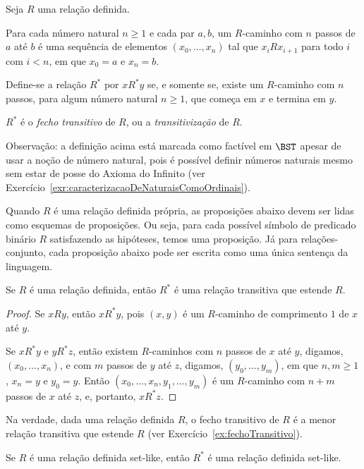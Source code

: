\begin{definition}[$\BST$]
    Seja $R$ uma relação definida.

    Para cada número natural $n\geq 1$ e cada par $a, b$, um $R$-caminho com $n$ passos de $a$ até $b$ é uma sequência de elementos $(x_0, \dots, x_{n})$ tal que $x_i R x_{i+1}$ para todo $i$ com $i<n$, em que $x_0=a$ e $x_{n}=b$.

    Define-se a relação $R^*$ por $x R^* y$ se, e somente se, existe um $R$-caminho com $n$ passos, para algum número natural $n\geq 1$, que começa em $x$ e termina em $y$.

    $R^*$ é o \emph{fecho transitivo} de $R$, ou a \emph{transitivização} de $R$.
\end{definition}

Observação: a definição acima está marcada como factível em $\BST$ apesar de usar a noção de número natural, pois é possível definir números naturais mesmo sem estar de posse do Axioma do Infinito (ver Exercício~\ref{exr:caracterizacaoDeNaturaisComoOrdinais}).

Quando $R$ é uma relação definida própria, as proposições abaixo devem ser lidas como esquemas de proposições.
Ou seja, para cada possível símbolo de predicado binário $R$ satisfazendo as hipóteses, temos uma proposição.
Já para relações-conjunto, cada proposição abaixo pode ser escrita como uma única sentença da linguagem.

\begin{proposition}[$\BST$]
    Se $R$ é uma relação definida, então $R^*$ é uma relação transitiva que estende $R$.
\end{proposition}
\begin{proof}
    Se $x R y$, então $x R^* y$, pois $(x,y)$ é um $R$-caminho de comprimento $1$ de $x$ até $y$.

    Se $x R^* y$ e $y R^* z$, então existem $R$-caminhos com $n$ passos de $x$ até $y$, digamos, $(x_0, \dots, x_n)$, e com $m$ passos de $y$ até $z$, digamos, $(y_0, \dots, y_m)$, em que $n,m\geq 1$, $x_n=y$ e $y_0=y$.
    Então $(x_0,\dots,x_n,y_1,\dots,y_m)$ é um $R$-caminho com $n+m$ passos de $x$ até $z$, e, portanto, $x R^* z$.
\end{proof}

Na verdade, dada uma relação definida $R$, o fecho transitivo de $R$ é a menor relação transitiva que estende $R$ (ver Exercício~\ref{ex:fechoTransitivo}).

\begin{proposition}[$\ZFmP$]\label{prop:fechoTransitivoDeRelacaoSetLike}
    Se $R$ é uma relação definida set-like, então $R^*$ é uma relação definida set-like.
\end{proposition}

